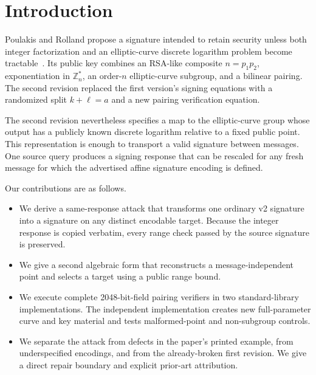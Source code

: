 \documentclass[10pt,a4paper]{article}
\newcommand{\Z}{\mathbb{Z}}
\begin{document}
\noindent{}

\section{Introduction}

Poulakis and Rolland propose a signature intended to retain security unless
both integer factorization and an elliptic-curve discrete logarithm problem
become tractable~\cite{poulakisrolland}.  Its public key combines an RSA-like
composite $n=p_1p_2$, exponentiation in $\Z_n^*$, an order-$n$ elliptic-curve
subgroup, and a bilinear pairing.  The second revision replaced the first
version's signing equations with a randomized split $k+\ell=a$ and a new
pairing verification equation.

The second revision nevertheless specifies a map to the elliptic-curve group
whose output has a publicly known discrete logarithm relative to a fixed
public point.  This representation is enough to transport a valid signature
between messages.  One source query produces a signing response that can be
rescaled for any fresh message for which the advertised affine signature
encoding is defined.

Our contributions are as follows.
\begin{itemize}
  \item We derive a same-response attack that transforms one ordinary v2
  signature into a signature on any distinct encodable target.  Because the
  integer response is copied verbatim, every range check passed by the source
  signature is preserved.
  \item We give a second algebraic form that reconstructs a
  message-independent point and selects a target using a public range bound.
  \item We execute complete 2048-bit-field pairing verifiers in two
  standard-library implementations.  The independent implementation creates
  new full-parameter curve and key material and tests malformed-point and
  non-subgroup controls.
  \item We separate the attack from defects in the paper's printed example,
  from underspecified encodings, and from the already-broken first revision.
  We give a direct repair boundary and explicit prior-art attribution.
\end{itemize}
\end{document}
